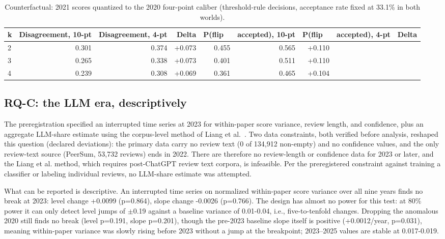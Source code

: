 \documentclass[10pt]{article}
\begin{document}
\begin{table}[t]
\centering
\caption{Counterfactual: 2021 scores quantized to the 2020 four-point caliber (threshold-rule decisions, acceptance rate fixed at 33.1\% in both worlds).}\label{tab:t5}
\begin{tabular}{lrrrrrrrr}\toprule
k & Disagreement, 10-pt & Disagreement, 4-pt & Delta & P(flip \ & accepted), 10-pt & P(flip \ & accepted), 4-pt & Delta \\
\midrule
2 & 0.301 & 0.374 & +0.073 & 0.455 & 0.565 & +0.110 \\
3 & 0.265 & 0.338 & +0.073 & 0.401 & 0.511 & +0.110 \\
4 & 0.239 & 0.308 & +0.069 & 0.361 & 0.465 & +0.104 \\
\bottomrule
\end{tabular}
\end{table}

\subsection{RQ-C: the LLM era, descriptively}

The preregistration specified an interrupted time series at 2023 for within-paper score variance, review length, and confidence, plus an aggregate LLM-share estimate using the corpus-level method of Liang et al.~\citep{liang2024}. Two data constraints, both verified before analysis, reshaped this question (declared deviations): the primary data carry no review text (0 of 134,912 non-empty) and no confidence values, and the only review-text source (PeerSum, 53,732 reviews) ends in 2022. There are therefore no review-length or confidence data for 2023 or later, and the Liang et al. method, which requires post-ChatGPT review text corpora, is infeasible. Per the preregistered constraint against training a classifier or labeling individual reviews, no LLM-share estimate was attempted.

What can be reported is descriptive. An interrupted time series on normalized within-paper score variance over all nine years finds no break at 2023: level change +0.0099 (p=0.864), slope change -0.0026 (p=0.766). The design has almost no power for this test: at 80\% power it can only detect level jumps of $\pm$0.19 against a baseline variance of 0.01-0.04, i.e., five-to-tenfold changes. Dropping the anomalous 2020 still finds no break (level p=0.191, slope p=0.201), though the pre-2023 baseline slope itself is positive (+0.0012/year, p=0.031), meaning within-paper variance was slowly rising before 2023 without a jump at the breakpoint; 2023--2025 values are stable at 0.017-0.019.
\end{document}
